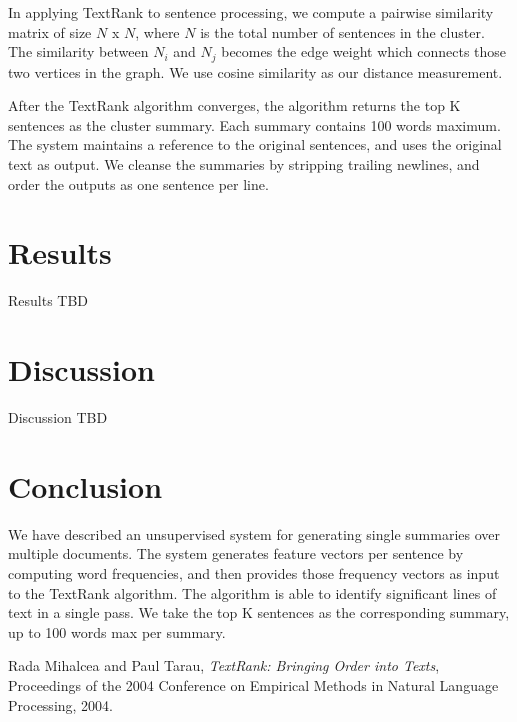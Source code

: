 \documentclass[11pt]{article}
\begin{document}
In applying TextRank to sentence processing, we compute a pairwise similarity matrix of size $N$ x $N$, where $N$ is the total number of sentences in the cluster. The similarity between $N_i$ and $N_j$ becomes the edge weight which connects those two vertices in the graph. We use cosine similarity as our distance measurement.

After the TextRank algorithm converges, the algorithm returns the top K sentences as the cluster summary. Each summary contains 100 words maximum. The system maintains a reference to the original sentences, and uses the original text as output. We cleanse the summaries by stripping trailing newlines, and order the outputs as one sentence per line.
\section{Results}

Results TBD

\section{Discussion}

Discussion TBD


\section{Conclusion}
 We have described an unsupervised system for generating single summaries over multiple documents. The system generates feature vectors per sentence by computing word frequencies, and then provides those frequency vectors as input to the TextRank algorithm. The algorithm is able to identify significant lines of text in a single pass. We take the top K sentences as the corresponding summary, up to 100 words max per summary.

%
%

\begin{thebibliography}{}

	Rada Mihalcea and Paul Tarau,
	\textit{TextRank: Bringing Order into Texts},
	Proceedings of the 2004 Conference on Empirical Methods in Natural Language Processing,
	2004.

\end{thebibliography}
\end{document}
